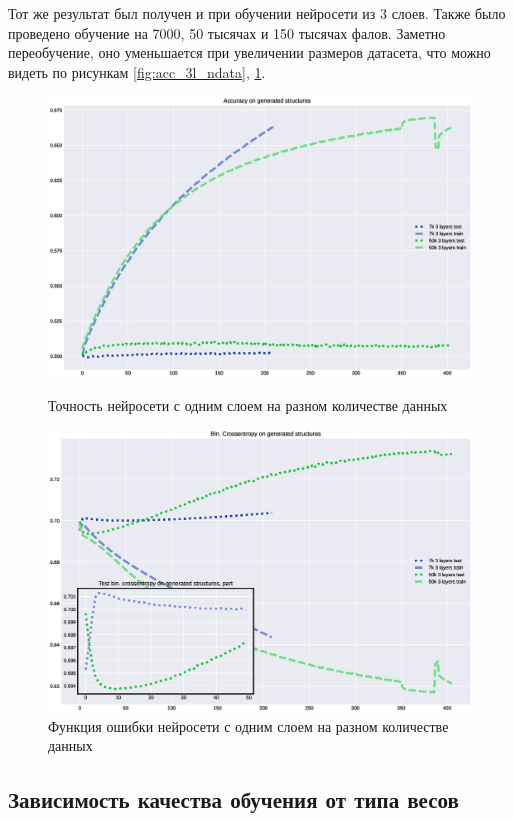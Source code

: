 \documentclass{article}
\begin{document}
Тот же результат был получен и при обучении нейросети из 3 слоев. Также было проведено обучение на 7000, 50 тысячах и 150 тысячах фалов. Заметно переобучение, оно уменьшается при увеличении размеров датасета, что можно видеть по рисункам \ref{fig:acc_3l_ndata}, \ref{fig:loss_3l_ndata}.
\begin{figure}[!h]
\includegraphics[width=\linewidth]{imgs/acc-3l_ndata.eps}
  \caption{Точность нейросети с одним слоем на разном количестве данных}\label{fig:acc_3l_ndata}
\endminipage\hfill
{}%
\includegraphics[width=\linewidth]{imgs/loss-3l_ndata.eps}
  \caption{Функция ошибки нейросети с одним слоем на разном количестве данных}\label{fig:loss_3l_ndata}
\endminipage
\end{figure}

\subsection{Зависимость качества обучения от типа весов}
\end{document}
